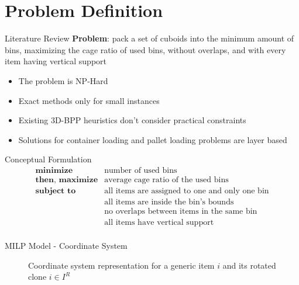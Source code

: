 \documentclass{beamer}
\begin{document}
    \section{Problem Definition}
    \begin{frame}{Literature Review}
        \textbf{Problem}: pack a set of cuboids into the minimum amount of bins, maximizing the cage ratio of used bins, without overlaps, and with every item having vertical support
        \begin{itemize}
            \item The problem is NP-Hard
            \item Exact methods only for small instances %
            \item Existing 3D-BPP heuristics don't consider practical constraints
            \item Solutions for container loading and pallet loading problems are layer based
        \end{itemize}
    \end{frame}

    \begin{frame}{Conceptual Formulation}
        \begin{eqnarray*}
            \textbf{minimize} & \text{number of used bins} \\
            \textbf{then, maximize} & \text{average cage ratio of the used bins} \\
            \textbf{subject to} & \text{all items are assigned to one and only one bin} \\
                                              & \text{all items are inside the bin's bounds} \\
                                              & \text{no overlaps between items in the same bin} \\
                                              & \text{all items have vertical support} \\
        \end{eqnarray*}
    \end{frame}

    \begin{frame}{MILP Model - Coordinate System}
        \begin{figure}
            \scalebox{0.45}{%
            
            }
            \caption{Coordinate system representation for a generic item $i$ and its rotated clone $i \in I^R$}
            \label{fig:coordinate_system}
        \end{figure}
    \end{frame}
\end{document}
